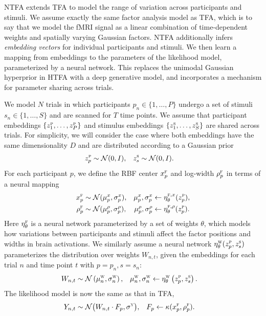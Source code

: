 \documentclass[twoside]{article}
\newcommand{\scf}{\textsc{f}}
\newcommand{\scw}{\textsc{w}}
\newcommand{\scp}{\textsc{p}}
\newcommand{\scs}{\textsc{s}}
\begin{document}
NTFA extends TFA to model the range of variation across participants and stimuli. We assume exactly the same factor analysis model as TFA, which is to say that we model the fMRI signal as a linear combination of time-dependent weights and spatially varying Gaussian factors. NTFA additionally infers \emph{embedding vectors} for individual participants and stimuli. We then learn a mapping from embeddings to the parameters of the likelihood model, parameterized by a neural network. This replaces the unimodal Gaussian hyperprior in HTFA with a deep generative model, and incorporates a mechanism for parameter sharing across trials.

We model $N$ trials in which participants $p_n \in \{1, \ldots, P\}$ undergo a set of stimuli $s_n \in \{1, \ldots, S\}$ and are scanned for $T$ time points. We assume that participant embeddings $\{z^\scp_1, \ldots, z^\scp_P\}$ and stimulus embeddings $\{z^\scs_1, \ldots, z^\scs_S\}$ are shared across trials. For simplicity, we will consider the case where both embeddings have the same dimensionality $D$ and are distributed according to a Gaussian prior
\begin{align}
    \label{eqs:sample_embeddings}
    z_{p}^\scp &\sim \mathcal{N}(0,I), 
    &
    z_{s}^\scs &\sim \mathcal{N}(0,I).
\end{align}
For each participant $p$, we define the RBF center $x^{\scf}_p$ and log-width $\rho^{\scf}_p$ in terms of a neural mapping
\begin{align}
    \label{eq:factor_mean}
    x^{\scf}_p &\sim \mathcal{N}(\mu^{x}_{p}, \sigma^{x}_{p}),
    &
    \mu^{x}_{p}, \sigma^{x}_{p} &\gets \eta^{\scf,x}_\theta (z^\scp_p),
    \\
    \label{eq:factor_width}
    \rho^{\scf}_{p} &\sim \mathcal{N}(\mu^{\rho}_{p}, \sigma^{\rho}_{p}),
    &
    \mu^{\rho}_{p}, \sigma^{\rho}_{p} &\gets \eta^{\scf,\rho}_\theta (z^\scp_p).
\end{align}
Here $\eta^{\scf}_\theta$ is a neural network parameterized by a set of weights $\theta$, which models how variations between participants and stimuli affect the factor positions and widths in brain activations.  We similarly assume a neural network $\eta^\scw_\theta(z^\scp_p, z^\scs_s)$ parameterizes the distribution over weights $W_{n,t}$, given the embeddings for each trial $n$ and time point $t$ with $p=p_n,s=s_n$:
\begin{align}
    \label{eq:weight_nn}
    W_{n,t} &\sim \mathcal{N} \left( \mu^{\textsc{w}}_{n}, \sigma^{\textsc{w}}_{n} \right),
    &
    \mu^{\textsc{w}}_{n}, \sigma^{\textsc{w}}_{n} 
    &\leftarrow 
    \eta^\scw_\theta \left( z^\scp_p, z^\scs_s \right).
\end{align}
The likelihood model is now the same as that in TFA,
\begin{align}
    \label{eq:image_generate}
    Y_{n,t} &\sim \mathcal{N}\big( W_{n,t} \cdot F_{p}, \sigma^\textsc{y}\big),
    &
    F_{p} &\leftarrow \kappa(x^\scf_{p}, \rho^{\scf}_{p}).
\end{align}
\end{document}
